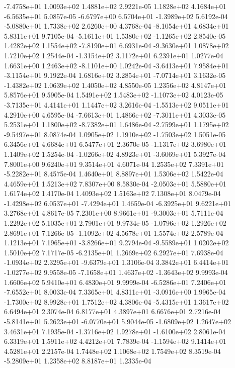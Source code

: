 -7.4758e+01  1.0093e+02  1.4881e+02  2.9221e-05
 1.1828e+02  4.1684e+01 -6.5635e+01  5.0857e-05
-6.6797e+00  6.5704e+01 -1.3989e+02  5.6192e-04
-5.0880e+01  1.7338e+02  2.6260e+00  4.3768e-04
-8.1054e+01  4.6834e+01  5.8311e+01  9.7105e-04
-5.1611e+01  1.5380e+02 -1.1265e+02  2.8540e-05
 1.4282e+02  1.1554e+02 -7.8190e+01  6.6931e-04
-9.3630e+01  1.0878e+02  1.7210e+02  1.2544e-04
-1.3154e+02  3.1172e+01  6.2391e+01  1.0277e-04
 1.6631e+00  1.2463e+02 -8.1101e+00  1.0242e-04
-3.6413e+01  7.9584e+01 -3.1154e+01  9.1922e-04
 1.6816e+02  3.2854e+01 -7.0714e+01  3.1632e-05
-1.4382e+02  1.0639e+02  1.4050e+02  4.8550e-05
1.2356e+02 4.8147e+01 5.8576e+01  9.5905e-04
 1.5491e+02  1.5483e+02 -1.1073e+02  4.0123e-05
-3.7135e+01  4.4141e+01  1.1447e+02  3.2616e-04
-1.5513e+02  9.0511e+01  4.2910e+00  4.6595e-04
-7.6613e+01  1.4866e+02 -7.3011e+01  4.3033e-05
 5.2531e+01  1.1800e+02 -8.7382e+01  1.6486e-04
-2.7599e+01  1.1795e+02 -9.5497e+01  8.0874e-04
 1.0905e+02  1.1910e+02 -1.7503e+02  1.5051e-05
6.3456e+01 4.6684e+01 6.5477e+01  2.3670e-05
-1.1317e+02  3.6980e+01  1.1409e+02  1.5254e-04
-1.0266e+02  4.8923e+01 -3.6069e+01  5.3927e-04
7.8001e+00 9.6240e+01 9.3514e+01  4.6071e-04
 1.2535e+02  7.3391e+01 -5.2282e+01  8.4575e-04
1.4640e+01 8.8897e+01 1.5306e+02  1.5422e-04
4.4659e+01 1.5213e+02 7.8307e+00  8.5830e-04
-2.0503e+01  5.5880e+01  1.6174e+02  1.4170e-04
1.4093e+02 1.5163e+02 7.1308e+01  8.0479e-04
-1.4298e+02  6.0537e+01 -7.4294e+01  1.4659e-04
-6.3925e+01  9.6221e+01  3.2768e+01  4.8617e-05
 7.2301e+00  8.9661e+01 -9.3003e+01  5.7111e-04
1.2292e+02 5.1035e+01 2.7901e+01  9.9734e-05
-1.0796e+02  1.2926e+02  2.8691e+01  7.1266e-05
-1.1092e+02  4.5678e+01  1.5574e+02  2.5789e-04
 1.1213e+01  7.1965e+01 -3.8266e+01  9.2794e-04
-9.5589e+01  1.0202e+02  1.5010e+02  7.1717e-05
-6.2135e+01  1.2669e+02  6.2927e+01  7.6938e-04
-1.0934e+02  2.3295e+01 -9.6379e+01  1.3106e-04
 3.3842e+01  6.4414e+01 -1.0277e+02  9.9558e-05
-7.1658e+01  1.4637e+02 -1.3643e+02  9.9993e-04
1.6606e+02 5.9410e+01 6.4830e+01  9.9999e-04
-6.5286e+01  7.2406e+01 -7.6552e+01  8.0033e-04
 7.3365e+01  4.8311e+01 -3.0916e+00  1.9965e-04
-1.7300e+02  8.9928e+01  1.7512e+02  4.3806e-04
-5.4315e+01  1.3617e+02  6.6494e+01  2.3074e-04
6.8177e+01 4.3897e+01 6.6676e+01  2.7216e-04
-5.8141e+01  5.2623e+01 -6.0770e+01  5.9044e-05
-1.6809e+02  1.2647e+02  3.4631e+01  7.1935e-04
-1.3716e+02  1.9278e+01 -1.6100e+02  2.8061e-04
6.3319e+01 1.5911e+02 4.4212e+01  7.7839e-04
-1.1594e+02  9.1414e+01  4.5281e+01  2.2157e-04
1.7448e+02 1.1068e+02 1.7549e+02  8.3519e-04
-5.2809e+01  1.2358e+02  8.8187e+01  1.2335e-04
